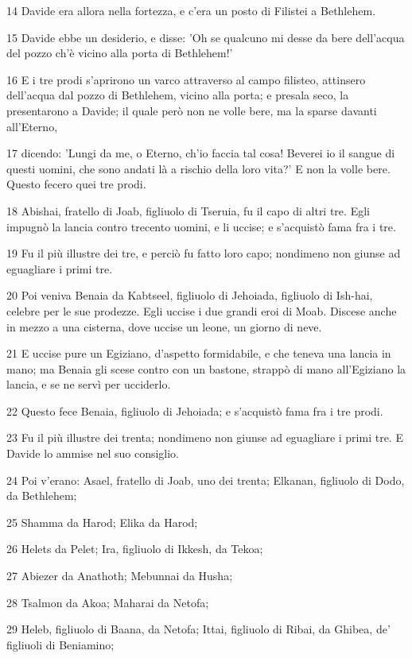 \par 14 Davide era allora nella fortezza, e c'era un posto di Filistei a Bethlehem.
\par 15 Davide ebbe un desiderio, e disse: 'Oh se qualcuno mi desse da bere dell'acqua del pozzo ch'è vicino alla porta di Bethlehem!'
\par 16 E i tre prodi s'aprirono un varco attraverso al campo filisteo, attinsero dell'acqua dal pozzo di Bethlehem, vicino alla porta; e presala seco, la presentarono a Davide; il quale però non ne volle bere, ma la sparse davanti all'Eterno,
\par 17 dicendo: 'Lungi da me, o Eterno, ch'io faccia tal cosa! Beverei io il sangue di questi uomini, che sono andati là a rischio della loro vita?' E non la volle bere. Questo fecero quei tre prodi.
\par 18 Abishai, fratello di Joab, figliuolo di Tseruia, fu il capo di altri tre. Egli impugnò la lancia contro trecento uomini, e li uccise; e s'acquistò fama fra i tre.
\par 19 Fu il più illustre dei tre, e perciò fu fatto loro capo; nondimeno non giunse ad eguagliare i primi tre.
\par 20 Poi veniva Benaia da Kabtseel, figliuolo di Jehoiada, figliuolo di Ish-hai, celebre per le sue prodezze. Egli uccise i due grandi eroi di Moab. Discese anche in mezzo a una cisterna, dove uccise un leone, un giorno di neve.
\par 21 E uccise pure un Egiziano, d'aspetto formidabile, e che teneva una lancia in mano; ma Benaia gli scese contro con un bastone, strappò di mano all'Egiziano la lancia, e se ne servì per ucciderlo.
\par 22 Questo fece Benaia, figliuolo di Jehoiada; e s'acquistò fama fra i tre prodi.
\par 23 Fu il più illustre dei trenta; nondimeno non giunse ad eguagliare i primi tre. E Davide lo ammise nel suo consiglio.
\par 24 Poi v'erano: Asael, fratello di Joab, uno dei trenta; Elkanan, figliuolo di Dodo, da Bethlehem;
\par 25 Shamma da Harod; Elika da Harod;
\par 26 Helets da Pelet; Ira, figliuolo di Ikkesh, da Tekoa;
\par 27 Abiezer da Anathoth; Mebunnai da Husha;
\par 28 Tsalmon da Akoa; Maharai da Netofa;
\par 29 Heleb, figliuolo di Baana, da Netofa; Ittai, figliuolo di Ribai, da Ghibea, de' figliuoli di Beniamino;
